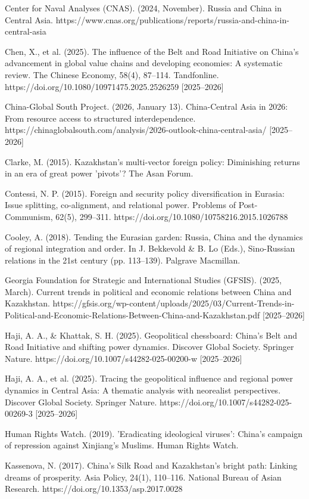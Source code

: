 \documentclass[12pt]{article}
\begin{document}
Center for Naval Analyses (CNAS). (2024, November). Russia and China in Central Asia. https://www.cnas.org/publications/reports/russia-and-china-in-central-asia\par
Chen, X., et al. (2025). The influence of the Belt and Road Initiative on China's advancement in global value chains and developing economies: A systematic review. The Chinese Economy, 58(4), 87--114. Tandfonline. https://doi.org/10.1080/10971475.2025.2526259 [2025--2026]\par
China-Global South Project. (2026, January 13). China-Central Asia in 2026: From resource access to structured interdependence. https://chinaglobalsouth.com/analysis/2026-outlook-china-central-asia/ [2025--2026]\par
Clarke, M. (2015). Kazakhstan's multi-vector foreign policy: Diminishing returns in an era of great power 'pivots'? The Asan Forum.\par
Contessi, N. P. (2015). Foreign and security policy diversification in Eurasia: Issue splitting, co-alignment, and relational power. Problems of Post-Communism, 62(5), 299--311. https://doi.org/10.1080/10758216.2015.1026788\par
Cooley, A. (2018). Tending the Eurasian garden: Russia, China and the dynamics of regional integration and order. In J. Bekkevold \& B. Lo (Eds.), Sino-Russian relations in the 21st century (pp. 113--139). Palgrave Macmillan.\par
Georgia Foundation for Strategic and International Studies (GFSIS). (2025, March). Current trends in political and economic relations between China and Kazakhstan. https://gfsis.org/wp-content/uploads/2025/03/Current-Trends-in-Political-and-Economic-Relations-Between-China-and-Kazakhstan.pdf [2025--2026]\par
Haji, A. A., \& Khattak, S. H. (2025). Geopolitical chessboard: China's Belt and Road Initiative and shifting power dynamics. Discover Global Society. Springer Nature. https://doi.org/10.1007/s44282-025-00200-w [2025--2026]\par
Haji, A. A., et al. (2025). Tracing the geopolitical influence and regional power dynamics in Central Asia: A thematic analysis with neorealist perspectives. Discover Global Society. Springer Nature. https://doi.org/10.1007/s44282-025-00269-3 [2025--2026]\par
Human Rights Watch. (2019). 'Eradicating ideological viruses': China's campaign of repression against Xinjiang's Muslims. Human Rights Watch.\par
Kassenova, N. (2017). China's Silk Road and Kazakhstan's bright path: Linking dreams of prosperity. Asia Policy, 24(1), 110--116. National Bureau of Asian Research. https://doi.org/10.1353/asp.2017.0028\par
\end{document}
